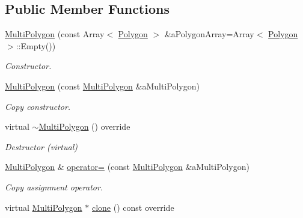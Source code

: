 \subsection*{Public Member Functions}
\begin{DoxyCompactItemize}
\item 
\hyperlink{classlibrary_1_1math_1_1geom_1_1d2_1_1objects_1_1_multi_polygon_a10c2390027c64a8541efde7fcb2b282f}{Multi\+Polygon} (const Array$<$ \hyperlink{classlibrary_1_1math_1_1geom_1_1d2_1_1objects_1_1_polygon}{Polygon} $>$ \&a\+Polygon\+Array=Array$<$ \hyperlink{classlibrary_1_1math_1_1geom_1_1d2_1_1objects_1_1_polygon}{Polygon} $>$\+::Empty())
\begin{DoxyCompactList}\small\item\em Constructor. \end{DoxyCompactList}\item 
\hyperlink{classlibrary_1_1math_1_1geom_1_1d2_1_1objects_1_1_multi_polygon_a2a64713865d9b308dbfcb56c209fdf56}{Multi\+Polygon} (const \hyperlink{classlibrary_1_1math_1_1geom_1_1d2_1_1objects_1_1_multi_polygon}{Multi\+Polygon} \&a\+Multi\+Polygon)
\begin{DoxyCompactList}\small\item\em Copy constructor. \end{DoxyCompactList}\item 
virtual \hyperlink{classlibrary_1_1math_1_1geom_1_1d2_1_1objects_1_1_multi_polygon_a4aa98e616ff0085fc1390bca368c984c}{$\sim$\+Multi\+Polygon} () override
\begin{DoxyCompactList}\small\item\em Destructor (virtual) \end{DoxyCompactList}\item 
\hyperlink{classlibrary_1_1math_1_1geom_1_1d2_1_1objects_1_1_multi_polygon}{Multi\+Polygon} \& \hyperlink{classlibrary_1_1math_1_1geom_1_1d2_1_1objects_1_1_multi_polygon_abd2fa0b95f3b339dda6e4b8ccd321af0}{operator=} (const \hyperlink{classlibrary_1_1math_1_1geom_1_1d2_1_1objects_1_1_multi_polygon}{Multi\+Polygon} \&a\+Multi\+Polygon)
\begin{DoxyCompactList}\small\item\em Copy assignment operator. \end{DoxyCompactList}\item 
virtual \hyperlink{classlibrary_1_1math_1_1geom_1_1d2_1_1objects_1_1_multi_polygon}{Multi\+Polygon} $\ast$ \hyperlink{classlibrary_1_1math_1_1geom_1_1d2_1_1objects_1_1_multi_polygon_a6dc8db614de9fb615491deb783fe7fcd}{clone} () const override

\end{DoxyCompactItemize}
